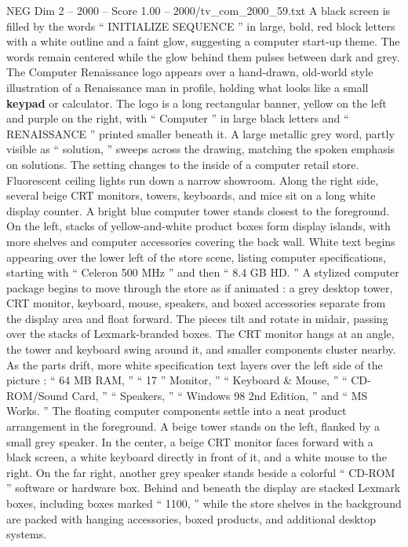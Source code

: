 \begin{textsample}{NEG Dim 2 – 2000 – Score 1.00 – 2000/tv\_com\_2000\_59.txt}  \label{ex:f2_neg_080}
A black screen is filled by the words “ INITIALIZE SEQUENCE ” in large, bold, red block letters with a white outline and a faint glow, suggesting a computer start-up theme.
The words remain centered while the glow behind them pulses between dark and grey.
The Computer Renaissance logo appears over a hand-drawn, old-world style illustration of a Renaissance man in profile, holding what looks like a small \textbf{keypad} or calculator.
The logo is a long rectangular banner, yellow on the left and purple on the right, with “ Computer ” in large black letters and “ RENAISSANCE ” printed smaller beneath it.
A large metallic grey word, partly visible as “ solution, ” sweeps across the drawing, matching the spoken emphasis on solutions.
The setting changes to the inside of a computer retail store.
Fluorescent ceiling lights run down a narrow showroom.
Along the right side, several beige CRT monitors, towers, keyboards, and mice sit on a long white display counter.
A bright blue computer tower stands closest to the foreground.
On the left, stacks of yellow-and-white product boxes form display islands, with more shelves and computer accessories covering the back wall.
White text begins appearing over the lower left of the store scene, listing computer specifications, starting with “ Celeron 500 MHz ” and then “ 8.4 GB HD. ” A stylized computer package begins to move through the store as if animated : a grey desktop tower, CRT monitor, keyboard, mouse, speakers, and boxed accessories separate from the display area and float forward.
The pieces tilt and rotate in midair, passing over the stacks of Lexmark-branded boxes.
The CRT monitor hangs at an angle, the tower and keyboard swing around it, and smaller components cluster nearby.
As the parts drift, more white specification text layers over the left side of the picture : “ 64 MB RAM, ” “ 17 ” Monitor, ” “ Keyboard \& Mouse, ” “ CD-ROM/Sound Card, ” “ Speakers, ” “ Windows 98 2nd Edition, ” and “ MS Works. ” The floating computer components settle into a neat product arrangement in the foreground.
A beige tower stands on the left, flanked by a small grey speaker.
In the center, a beige CRT monitor faces forward with a black screen, a white keyboard directly in front of it, and a white mouse to the right.
On the far right, another grey speaker stands beside a colorful “ CD-ROM ” software or hardware box.
Behind and beneath the display are stacked Lexmark boxes, including boxes marked “ 1100, ” while the store shelves in the background are packed with hanging accessories, boxed products, and additional desktop systems.

\end{textsample}
